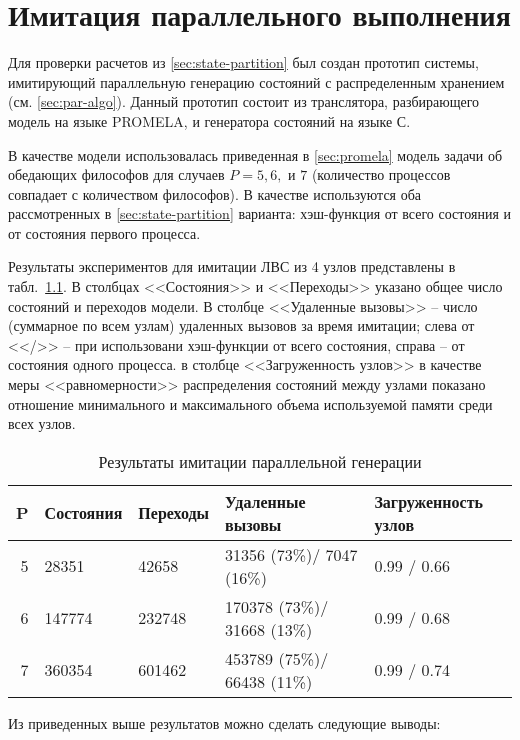 \chapter{Имитация параллельного выполнения}
\label{cha:paremu}

Для проверки расчетов из \ref{sec:state-partition} был создан прототип
системы, имитирующий параллельную генерацию состояний с распределенным
хранением (см. \ref{sec:par-algo}). Данный прототип состоит из
транслятора, разбирающего модель на языке PROMELA, и генератора
состояний на языке С.

В качестве модели использовалась приведенная в \ref{sec:promela}
модель задачи об обедающих философов для случаев $P = 5, 6, \text{ и }
7$ (количество процессов совпадает с количеством философов). В
качестве  используются оба рассмотренных в
\ref{sec:state-partition} варианта: хэш-функция от всего состояния и
от состояния первого процесса. 

Результаты экспериментов для имитации ЛВС из 4 узлов представлены в
табл.~\ref{tab:paremu-stats}. В столбцах <<Состояния>> и <<Переходы>> указано
общее число состояний и переходов модели. В столбце <<Удаленные вызовы>> --
число (суммарное по всем узлам) удаленных вызовов за время имитации; слева от
<</>> -- при использовани хэш-функции от всего состояния, справа -- от состояния
одного процесса. в столбце <<Загруженность узлов>> в качестве меры
<<равномерности>> распределения состояний между узлами показано отношение
минимального и максимального объема используемой памяти среди всех узлов.

\begin{table}[ht]
  \centering
  \begin{tabular}[ht]{|r|l|l|l|p{}|}
    \hline
    P & Состояния & Переходы & Удаленные вызовы & Загруженность узлов    \\
    \hline
    5 & 28351     & 42658    & 31356  (73\%)/ 7047  (16\%) & 0.99 / 0.66 \\ 
    6 & 147774    & 232748   & 170378 (73\%)/ 31668 (13\%) & 0.99 / 0.68 \\ 
    7 & 360354    & 601462   & 453789 (75\%)/ 66438 (11\%) & 0.99 / 0.74 \\ 
    \hline
  \end{tabular}
  \caption{Результаты имитации параллельной генерации}
  \label{tab:paremu-stats}
\end{table}

Из приведенных выше результатов можно сделать следующие выводы:

